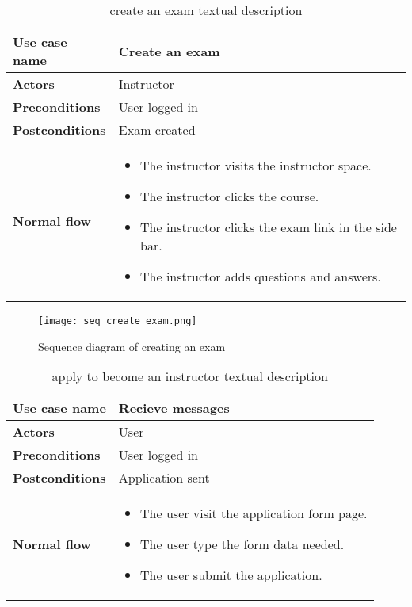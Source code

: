 \begin{table}[H]
\centering
\caption{create an exam textual description}
\begin{tabular}{|p{4cm}|p{10cm}|}
\hline
\textbf{\large{Use case name}} & Create an exam \\\hline
\textbf{\large{Actors}} & Instructor \\\hline
\textbf{\large{Preconditions}} & User logged in \\\hline
\textbf{\large{Postconditions}} & Exam created  \\\hline
\textbf{\large{Normal flow}} & 
\begin{itemize}
  \item The instructor visits the instructor space.
  \item The instructor clicks the course.
  \item The instructor clicks the exam link in the side bar.
  \item The instructor adds questions and answers.
\end{itemize}
\\\hline

\end{tabular}
\end{table}

\begin{figure}[!ht]
    \centering
    \texttt{[image: seq\_create\_exam.png]}
    \caption{Sequence diagram of creating an exam}
    \label{fig:seq_create_exam}
\end{figure}


\vfill
\clearpage

\begin{table}[H]
\centering
\caption{apply to become an instructor textual description}
\begin{tabular}{|p{4cm}|p{10cm}|}
\hline
\textbf{\large{Use case name}} & Recieve messages \\\hline
\textbf{\large{Actors}} & User \\\hline
\textbf{\large{Preconditions}} & User logged in \\\hline
\textbf{\large{Postconditions}} & Application sent \\\hline
\textbf{\large{Normal flow}} & 
\begin{itemize}
  \item The user visit the application form page.
  \item The user type the form data needed.
  \item The user submit the application.
\end{itemize}
\\\hline

\end{tabular}
\end{table}

